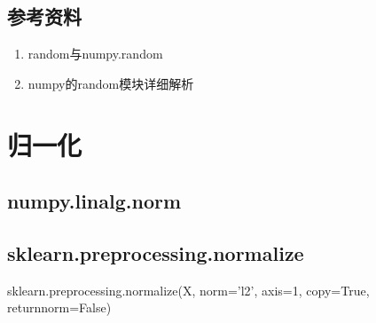 \documentclass[letterpaper,10pt,english]{sphinxmanual}
\begin{document}
\subsection{参考资料}
\label{\detokenize{python/09_random:id2}}\begin{enumerate}
\item {} 
random与numpy.random

\end{enumerate}
\begin{quote}

\end{quote}
\begin{enumerate}
\setcounter{enumi}{1}
\item {} 
numpy的random模块详细解析

\end{enumerate}
\begin{quote}

\end{quote}


\section{归一化}
\label{\detokenize{python/10_normalize::doc}}\label{\detokenize{python/10_normalize:id1}}

\subsection{numpy.linalg.norm}
\label{\detokenize{python/10_normalize:numpy-linalg-norm}}
%
\begin{sphinxVerbatim}[commandchars=\\\{\}]
   
\end{sphinxVerbatim}


\subsection{sklearn.preprocessing.normalize}
\label{\detokenize{python/10_normalize:sklearn-preprocessing-normalize}}
%
\begin{sphinxVerbatim}[commandchars=\\\{\}]
sklearn.preprocessing.normalize(X, norm=’l2’, axis=1, copy=True, return\PYGZus{}norm=False)
\end{sphinxVerbatim}
\end{document}
